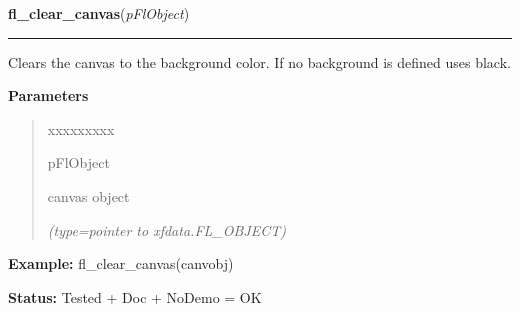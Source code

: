\hspace{.8\funcindent}\begin{boxedminipage}{\funcwidth}

    \raggedright \textbf{fl\_clear\_canvas}(\textit{pFlObject})

    \vspace{-1.5ex}

    \rule{\textwidth}{0.5\fboxrule}
\setlength{\parskip}{2ex}
    Clears the canvas to the background color. If no background is defined 
    uses black.

\setlength{\parskip}{1ex}
      \textbf{Parameters}
      \vspace{-1ex}

      \begin{quote}
        \begin{Ventry}{xxxxxxxxx}

          \item[pFlObject]

          canvas object

            {\it (type=pointer to xfdata.FL\_OBJECT)}

        \end{Ventry}

      \end{quote}

\textbf{Example:} fl\_clear\_canvas(canvobj)



\textbf{Status:} Tested + Doc + NoDemo = OK



    \end{boxedminipage}

    \label{xformslib:flcanvas:fl_modify_canvas_prop}

    \vspace{0.5ex}

